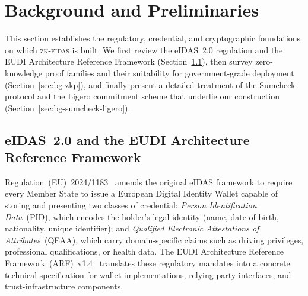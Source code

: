 \section{Background and Preliminaries}\label{sec:background}

This section establishes the regulatory, credential, and cryptographic
foundations on which \textsc{zk-eidas} is built.  We first review the eIDAS~2.0
regulation and the EUDI Architecture Reference Framework
(Section~\ref{sec:bg-eidas}), then survey zero-knowledge proof families and
their suitability for government-grade deployment
(Section~\ref{sec:bg-zkp}), and finally present a detailed treatment of the
Sumcheck protocol and the Ligero commitment scheme that underlie our
construction (Section~\ref{sec:bg-sumcheck-ligero}).

\subsection{eIDAS~2.0 and the EUDI Architecture Reference Framework}
\label{sec:bg-eidas}

Regulation~(EU)~2024/1183~\cite{eidas2} amends the original eIDAS framework to
require every Member State to issue a European Digital Identity Wallet capable
of storing and presenting two classes of credential: \emph{Person
Identification Data}~(PID), which encodes the holder's legal identity (name,
date of birth, nationality, unique identifier); and \emph{Qualified Electronic
Attestations of Attributes}~(QEAA), which carry domain-specific claims such as
driving privileges, professional qualifications, or health data.  The EUDI
Architecture Reference Framework~(ARF)~v1.4~\cite{eudi-arf} translates these
regulatory mandates into a concrete technical specification for wallet
implementations, relying-party interfaces, and trust-infrastructure components.

